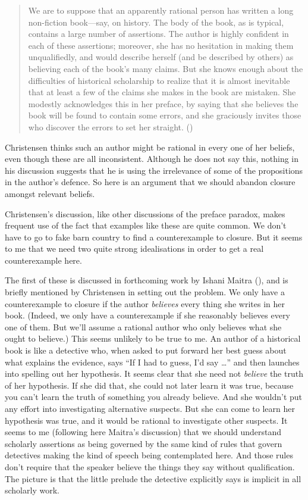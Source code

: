 \documentclass[
  11pt,
  letterpaper,
  DIV=11,
  numbers=noendperiod,
  oneside]{scrartcl}
\begin{document}
\begin{quote}
We are to suppose that an apparently rational person has written a long
non-fiction book---say, on history. The body of the book, as is typical,
contains a large number of assertions. The author is highly confident in
each of these assertions; moreover, she has no hesitation in making them
unqualifiedly, and would describe herself (and be described by others)
as believing each of the book's many claims. But she knows enough about
the difficulties of historical scholarship to realize that it is almost
inevitable that at least a few of the claims she makes in the book are
mistaken. She modestly acknowledges this in her preface, by saying that
she believes the book will be found to contain some errors, and she
graciously invites those who discover the errors to set her straight.
()
\end{quote}

Christensen thinks such an author might be rational in every one of her
beliefs, even though these are all inconsistent. Although he does not
say this, nothing in his discussion suggests that he is using the
irrelevance of some of the propositions in the author's defence. So here
is an argument that we should abandon closure amongst relevant beliefs.

Christensen's discussion, like other discussions of the preface paradox,
makes frequent use of the fact that examples like these are quite
common. We don't have to go to fake barn country to find a
counterexample to closure. But it seems to me that we need two quite
strong idealisations in order to get a real counterexample here.

The first of these is discussed in forthcoming work by Ishani Maitra
(), and is briefly mentioned by
Christensen in setting out the problem. We only have a counterexample to
closure if the author \emph{believes} every thing she writes in her
book. (Indeed, we only have a counterexample if she reasonably believes
every one of them. But we'll assume a rational author who only believes
what she ought to believe.) This seems unlikely to be true to me. An
author of a historical book is like a detective who, when asked to put
forward her best guess about what explains the evidence, says ``If I had
to guess, I'd say \ldots{}'' and then launches into spelling out her
hypothesis. It seems clear that she need not \emph{believe} the truth of
her hypothesis. If she did that, she could not later learn it was true,
because you can't learn the truth of something you already believe. And
she wouldn't put any effort into investigating alternative suspects. But
she can come to learn her hypothesis was true, and it would be rational
to investigate other suspects. It seems to me (following here Maitra's
discussion) that we should understand scholarly assertions as being
governed by the same kind of rules that govern detectives making the
kind of speech being contemplated here. And those rules don't require
that the speaker believe the things they say without qualification. The
picture is that the little prelude the detective explicitly says is
implicit in all scholarly work.
\end{document}
